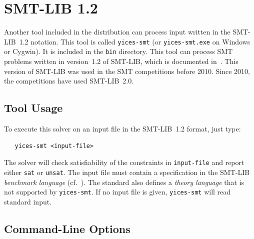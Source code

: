 \documentclass[11pt,twoside,fleqn,openright,titlepage]{cslreport}
\begin{document}
\section{SMT-LIB 1.2}

Another tool included in the distribution can process input written in
the SMT-LIB~1.2 notation. This tool is called \texttt{yices-smt} (or
\texttt{yices-smt.exe} on Windows or Cygwin). It is included in the
\texttt{bin} directory.  This tool can process SMT problems written in
version~1.2 of SMT-LIB, which is documented
in~\cite{SMTLIB12:2006}. This version of SMT-LIB was used in the SMT
competitions before 2010.  Since 2010, the competitions have used
SMT-LIB~2.0.


\subsection{Tool Usage}

To execute this solver on an input file in the SMT-LIB~1.2 format, just type:
\begin{small}
\begin{verbatim}
   yices-smt <input-file>
\end{verbatim}
\end{small}
The solver will check satisfiability of the constraints in
\texttt{input-file} and report either \texttt{sat} or
\texttt{unsat}. The input file must contain a specification in the
SMT-LIB {\em benchmark language\/} (cf.~\cite{SMTLIB12:2006}). The
standard also defines a {\em theory language\/} that is not supported
by \texttt{yices-smt}. If no input file is given, \texttt{yices-smt}
will read standard input.


\subsection{Command-Line Options}
\end{document}
